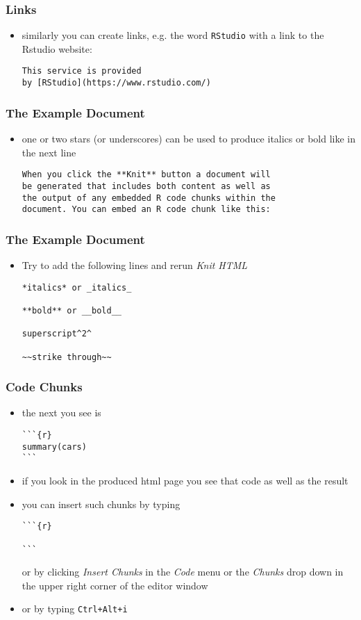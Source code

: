 \begin{frame}[fragile]\frametitle{Links}
  \begin{itemize}
  \item similarly you can create links, e.g. the word \texttt{RStudio} with a link to the Rstudio website: 
\begin{verbatim}
This service is provided
by [RStudio](https://www.rstudio.com/)
\end{verbatim}
  \end{itemize}
\end{frame}


\begin{frame}[fragile]\frametitle{The Example Document}
  \begin{itemize}
  \item one or two stars (or underscores) can be used to produce italics or bold like in the next line
\begin{verbatim}
When you click the **Knit** button a document will
be generated that includes both content as well as
the output of any embedded R code chunks within the
document. You can embed an R code chunk like this:
\end{verbatim}

  \end{itemize}
\end{frame}

\begin{frame}[fragile]\frametitle{The Example Document}
  \begin{itemize}
  \item Try to add the following lines and rerun \textit{Knit HTML}
    
\begin{verbatim}
*italics* or _italics_

**bold** or __bold__

superscript^2^

~~strike through~~
\end{verbatim}
  
  \end{itemize}
\end{frame}


\begin{frame}[fragile]\frametitle{Code Chunks}
  \begin{itemize}
  \item the next you see is
    \small
\begin{verbatim}
```{r}
summary(cars)
```
\end{verbatim}
    \normalsize
  \item if you look in the produced html page you see that code as well as the result
  \item you can insert such chunks by typing
        \small
\begin{verbatim}
```{r}

```
\end{verbatim}
        \normalsize
    or by clicking \textit{Insert Chunks} in the \textit{Code} menu or the \textit{Chunks} drop down in the upper right corner of the editor window
  \item or by typing \texttt{Ctrl+Alt+i}
  \end{itemize}
\end{frame}


